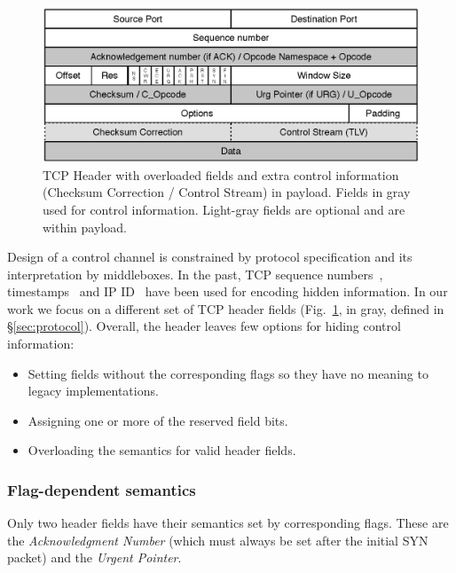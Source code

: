 \documentclass{sig-alternate-10pt}
\begin{document}
\begin{figure}[t!]
\centering
\small{
\includegraphics[width=\columnwidth]{figs/tcp-header}
\caption{TCP Header with overloaded fields and extra control information (Checksum Correction / Control Stream) in payload. Fields in gray used for control information. Light-gray fields are optional and are within payload.}
\label{fig:header}
}
\vspace{-4mm}
\end{figure}

Design of a control channel is constrained by protocol specification and its interpretation by middleboxes. In the past, TCP sequence numbers~\cite{Murdoch:2005fz}, timestamps~\cite{Giffin:2002wh} and IP ID~\cite{Ahsan:2002wc} have been used for encoding hidden information. In our work we focus on a different set of TCP header fields (Fig.~\ref{fig:header}, in gray, defined in \S\ref{sec:protocol}). Overall, the header leaves few options for hiding control information:
\begin{itemize}
    \item Setting fields without the corresponding flags so they have no meaning to legacy implementations.
    \item Assigning one or more of the reserved field bits.
    \item Overloading the semantics for valid header fields.
\end{itemize}

\subsubsection*{Flag-dependent semantics}
\label{sec:unset}

Only two header fields have their semantics set by corresponding flags. These are the \emph{Acknowledgment Number} (which must always be set after the initial SYN packet) and the \emph{Urgent Pointer}. 
\end{document}

